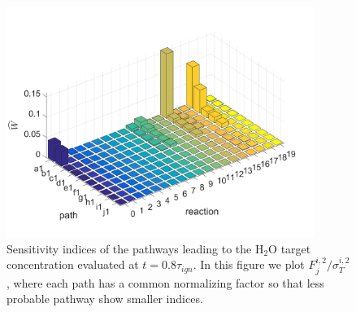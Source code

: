 \paragraph{}
\begin{figure}[htbp]
	\caption[Sensitivity indices of the pathways leading to the H$_2$O target concentration]{Sensitivity indices of the pathways leading to the H$_2$O target concentration evaluated at $t=0.8\tau_{ign}$. In this figure we plot $F_j^{i,2}/\sigma_T^{i,2}$, where each path has a common normalizing factor so that less probable pathway show smaller indices.}
    \begin{center}
	\includegraphics[width=100mm]{figs/chapter3/fig12.png}
    \end{center}
\label{ch3:fig12}
\end{figure}

